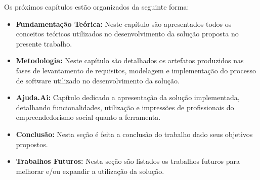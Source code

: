 Os próximos capítulos estão organizados da seguinte forma:

\begin{itemize}
  \item \textbf{Fundamentação Teórica:} Neste capítulo são apresentados todos os conceitos teóricos utilizados no desenvolvimento da solução proposta no presente trabalho.
  \item \textbf{Metodologia:} Neste capítulo são detalhados os artefatos produzidos nas fases de levantamento de requisitos, modelagem e implementação do processo de software utilizado no desenvolvimento da solução.
  \item \textbf{Ajuda.Ai:} Capítulo dedicado a apresentação da solução implementada, detalhando funcionalidades, utilização e impressões de profissionais do empreendedorismo social quanto a ferramenta.
  \item \textbf{Conclusão:} Nesta seção é feita a conclusão do trabalho dado seus objetivos propostos.
  \item \textbf{Trabalhos Futuros:} Nesta seção são listados os trabalhos futuros para melhorar e/ou expandir a utilização da solução.
\end{itemize}